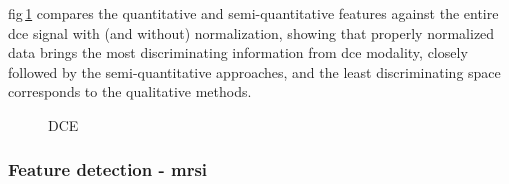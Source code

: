 \documentclass[a4paper,num-refs]{wiley-article}
\begin{document}
\Acl{fig}\,\ref{fig:DCE-norm} compares the quantitative and semi-quantitative
features against the entire \ac{dce} signal with (and without) normalization,
showing that properly normalized data brings the most discriminating information
from \ac{dce} modality, closely followed by the semi-quantitative approaches,
and the least discriminating space corresponds to the qualitative methods.

\begin{figure}
  \hspace*{\fill}
  \hfill
  \hspace*{\fill}
  \caption[DCE] {DCE}
  \label{fig:DCE-norm}
\end{figure}

\subsubsection{Feature detection - \Ac{mrsi}}
\end{document}
